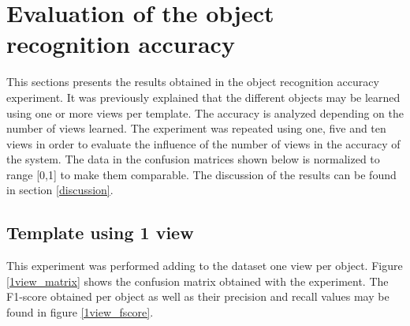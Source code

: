 \section{ Evaluation of the object recognition accuracy}
\label{results_accuracy_measurement}
This sections presents the results obtained in the object recognition accuracy experiment. 
It was previously explained that the different objects may be learned using one or more views per template. 
The accuracy is analyzed depending on the number of views learned. 
The experiment was repeated using one, five and ten views in order to evaluate the influence of the number of views in the accuracy of the system. %
The data in the confusion matrices shown below is normalized to range [0,1] to make them comparable.
The discussion of the results can be found in section \ref{discussion}.

\subsection{Template using 1 view}
This experiment was performed adding to the dataset one view per object. 
Figure \ref{1view_matrix} shows the confusion matrix obtained with the experiment. 
The F1-score obtained per object as well as their precision and recall values may be found in figure \ref{1view_fscore}.





